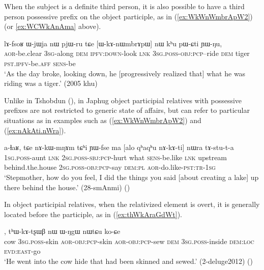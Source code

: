 When the subject is a definite third person, it is also possible to have a third person possessive prefix on the object participle, as in (\ref{ex:WkWnWmbrApW2}) (or \ref{ex:WCWkAnAma} above).

\begin{exe}
\ex \label{ex:WkWnWmbrApW2}
\gll  lɤ-fsoʁ ɯ-jɯja nɯ pjɯ-ru tɕe [ɯ-kɤ-nɯmbrɤpɯ] nɯ kʰu pɯ-ɕti ɲɯ-ŋu,  \\
\textsc{aor}-be.clear    \textsc{3sg}-along  \textsc{dem} \textsc{ipfv}:\textsc{down}-look \textsc{lnk} \textsc{3sg}.\textsc{poss}-\textsc{obj}:\textsc{pcp}--ride \textsc{dem} tiger \textsc{pst}.\textsc{ipfv}-be.\textsc{aff}  \textsc{sens}-be \\
\glt `As the day broke, looking down, he [progressively realized that] what he was riding was a tiger.' (2005 khu)
\end{exe}

Unlike in Tshobdun (\citealt[10]{jacksonlin07}), in Japhug object participial relatives with possessive prefixes are not restricted to generic state of affairs, but can refer to particular situations as in examples such as (\ref{ex:WkWnWmbrApW2}) and (\ref{ex:nAkAti.nWra}).

\begin{exe}
\ex \label{ex:nAkAti.nWra}
\gll a-ɬaʁ, tɕe nɤ-kɯ-mŋɤm tɕʰi ɲɯ-fse ma [alo qʰaqʰu nɤ-kɤ-ti] nɯra tɤ-stu-t-a \\
\textsc{1sg}.\textsc{poss}-aunt \textsc{lnk} \textsc{2sg}.\textsc{poss}-\textsc{sbj}:\textsc{pcp}-hurt what \textsc{sens}-be.like \textsc{lnk} upstream behind.the.house \textsc{2sg}.\textsc{poss}-\textsc{obj}:\textsc{pcp}-say \textsc{dem}:\textsc{pl} \textsc{aor}-do.like-\textsc{pst}:\textsc{tr}-\textsc{1sg} \\
\glt `Stepmother, how do you feel, I did the things you said [about creating a lake] up there behind the house.' (28-smAnmi)
()
\end{exe}


In object participial relatives, when the relativized element is overt, it is generally located before the participle, as in (\ref{ex:thWkAraGdWt}). 

\begin{exe}
\ex \label{ex:thWkAraGdWt}
, tʰɯ-kɤ-tʂɯβ nɯ ɯ-ŋgɯ nɯtɕu ko-ɕe  \\
cow \textsc{3sg}.\textsc{poss}-skin \textsc{aor}-\textsc{obj}:\textsc{pcp}-skin \textsc{aor}-\textsc{obj}:\textsc{pcp}-sew \textsc{dem} \textsc{3sg}.\textsc{poss}-inside \textsc{dem}:\textsc{loc} \textsc{evd}:\textsc{east}-go \\
\glt  `He went into the cow hide that had been skinned and sewed.'    (2-deluge2012) 	()
\end{exe}  

